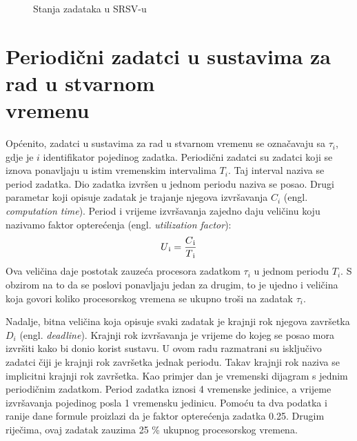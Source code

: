 \documentclass[../zavrsni.tex]{subfiles}
\begin{document}
\begin{figure}[!htb]
    \caption{\label{fig:my-label} Stanja zadataka u SRSV-u}
  \end{figure}

\section{Periodični zadatci u sustavima za rad u stvarnom \\vremenu}

Općenito, zadatci u sustavima za rad u stvarnom vremenu se označavaju sa $\tau_i$, gdje je $i$ identifikator pojedinog zadatka. 
Periodični zadatci su zadatci koji se iznova ponavljaju u istim vremenskim intervalima $T_i$. Taj interval naziva se period zadatka.
Dio zadatka izvršen u jednom periodu naziva se posao.
Drugi parametar koji opisuje zadatak je trajanje njegova izvršavanja $C_i$ (engl. \textit{computation time}). Period i vrijeme izvršavanja zajedno daju veličinu 
koju nazivamo faktor opterećenja (engl. \textit{utilization factor}):
\begin{equation*}
  U\textsubscript{i} = \frac{C\textsubscript{i}}{T\textsubscript{i}}
\end{equation*}
Ova veličina daje postotak zauzeća procesora zadatkom $\tau_i$ u jednom periodu $T_i$. S obzirom na to da se poslovi
ponavljaju jedan za drugim, to je ujedno i veličina koja govori koliko procesorskog vremena se ukupno troši na zadatak $\tau_i$.

Nadalje, bitna veličina koja opisuje svaki zadatak je krajnji rok njegova završetka $D_i$  (engl. \textit{deadline}). Krajnji rok izvršavanja je vrijeme 
do kojeg se posao mora izvršiti kako bi donio korist sustavu. U ovom radu razmatrani su 
isključivo zadatci čiji je krajnji rok završetka jednak periodu. Takav krajnji rok naziva se implicitni krajnji rok završetka. 
Kao primjer dan je vremenski dijagram s jednim periodičnim zadatkom.
Period zadatka iznosi 4 vremenske jedinice, a vrijeme izvršavanja pojedinog posla 1 vremensku jedinicu. Pomoću ta dva podatka i ranije 
dane formule proizlazi da je faktor opterećenja zadatka 0.25. Drugim riječima, ovaj zadatak zauzima 25 \% ukupnog procesorskog vremena.
\end{document}
